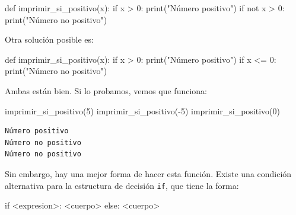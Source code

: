\documentclass[
  letterpaper,
  DIV=11,
  numbers=noendperiod]{scrreprt}
\newenvironment{Shaded}{\begin{snugshade}}{\end{snugshade}}
\newcommand{\BuiltInTok}[1]{\textcolor[rgb]{0.00,0.23,0.31}{#1}}
\newcommand{\ControlFlowTok}[1]{\textcolor[rgb]{0.00,0.23,0.31}{#1}}
\newcommand{\DecValTok}[1]{\textcolor[rgb]{0.68,0.00,0.00}{#1}}
\newcommand{\KeywordTok}[1]{\textcolor[rgb]{0.00,0.23,0.31}{#1}}
\newcommand{\NormalTok}[1]{\textcolor[rgb]{0.00,0.23,0.31}{#1}}
\newcommand{\OperatorTok}[1]{\textcolor[rgb]{0.37,0.37,0.37}{#1}}
\newcommand{\StringTok}[1]{\textcolor[rgb]{0.13,0.47,0.30}{#1}}
\begin{document}
\begin{Shaded}
\begin{Highlighting}[]
\KeywordTok{def}\NormalTok{ imprimir\_si\_positivo(x):}
  \ControlFlowTok{if}\NormalTok{ x }\OperatorTok{\textgreater{}} \DecValTok{0}\NormalTok{:}
      \BuiltInTok{print}\NormalTok{(}\StringTok{"Número positivo"}\NormalTok{)}
  \ControlFlowTok{if} \KeywordTok{not}\NormalTok{ x }\OperatorTok{\textgreater{}} \DecValTok{0}\NormalTok{:}
      \BuiltInTok{print}\NormalTok{(}\StringTok{"Número no positivo"}\NormalTok{)}
\end{Highlighting}
\end{Shaded}

Otra solución posible es:

\begin{Shaded}
\begin{Highlighting}[]
\KeywordTok{def}\NormalTok{ imprimir\_si\_positivo(x):}
  \ControlFlowTok{if}\NormalTok{ x }\OperatorTok{\textgreater{}} \DecValTok{0}\NormalTok{:}
      \BuiltInTok{print}\NormalTok{(}\StringTok{"Número positivo"}\NormalTok{)}
  \ControlFlowTok{if}\NormalTok{ x }\OperatorTok{\textless{}=} \DecValTok{0}\NormalTok{:}
      \BuiltInTok{print}\NormalTok{(}\StringTok{"Número no positivo"}\NormalTok{)}
\end{Highlighting}
\end{Shaded}

Ambas están bien. Si lo probamos, vemos que funciona:

\begin{Shaded}
\begin{Highlighting}[]
\NormalTok{imprimir\_si\_positivo(}\DecValTok{5}\NormalTok{)}
\NormalTok{imprimir\_si\_positivo(}\OperatorTok{{-}}\DecValTok{5}\NormalTok{)}
\NormalTok{imprimir\_si\_positivo(}\DecValTok{0}\NormalTok{)}
\end{Highlighting}
\end{Shaded}

\begin{verbatim}
Número positivo
Número no positivo
Número no positivo
\end{verbatim}

Sin embargo, hay una mejor forma de hacer esta función. Existe una
condición alternativa para la estructura de decisión \texttt{if}, que
tiene la forma:

\begin{Shaded}
\begin{Highlighting}[]
\ControlFlowTok{if} \OperatorTok{\textless{}}\NormalTok{expresion}\OperatorTok{\textgreater{}}\NormalTok{:}
    \OperatorTok{\textless{}}\NormalTok{cuerpo}\OperatorTok{\textgreater{}}
\ControlFlowTok{else}\NormalTok{:}
    \OperatorTok{\textless{}}\NormalTok{cuerpo}\OperatorTok{\textgreater{}}
\end{Highlighting}
\end{Shaded}
\end{document}
